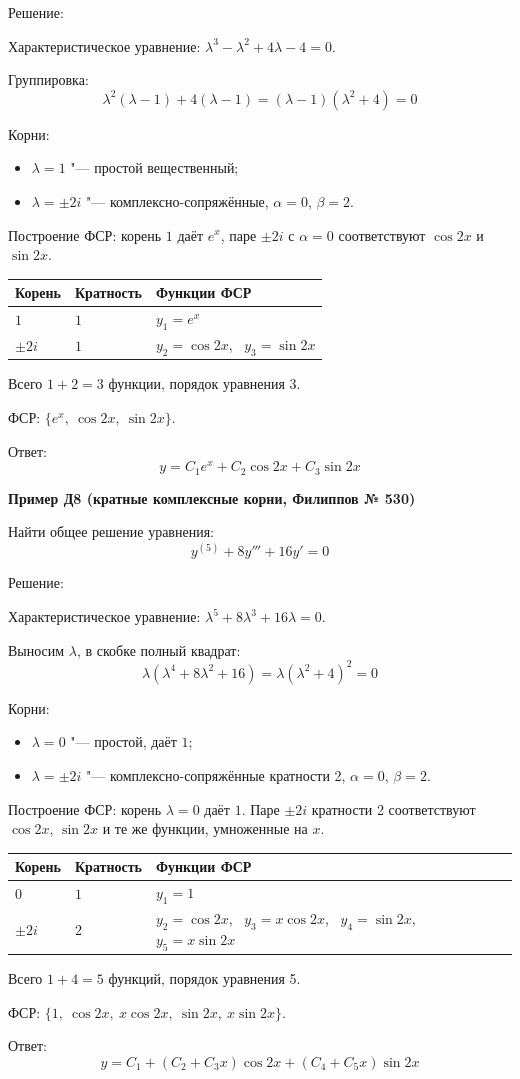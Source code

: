\documentclass[11pt,a4paper]{article}
\makeatletter
\newcommand{\example}[1]{\par\medskip\noindent\textbf{#1}\par\nopagebreak\smallskip}
\newenvironment{fsrtable}{\begin{center}\begin{tabular}{@{}lll@{}}\toprule
Корень & Кратность & Функции ФСР\\\midrule}{\\\bottomrule\end{tabular}\end{center}}
\makeatother
\begin{document}
Решение:

Характеристическое уравнение: $\lambda^3 - \lambda^2 + 4\lambda - 4 = 0$.

Группировка:
\[
  \lambda^2(\lambda - 1) + 4(\lambda - 1) = (\lambda - 1)(\lambda^2 + 4) = 0
\]

Корни:
\begin{itemize}
  \item $\lambda = 1$ "--- простой вещественный;
  \item $\lambda = \pm 2i$ "--- комплексно-сопряжённые, $\alpha = 0$, $\beta = 2$.
\end{itemize}

Построение ФСР: корень $1$ даёт $e^{x}$, паре $\pm 2i$ с $\alpha = 0$ соответствуют $\cos 2x$ и $\sin 2x$.
\begin{fsrtable}
$1$ & $1$ & $y_1 = e^{x}$\\
$\pm 2i$ & $1$ & $y_2 = \cos 2x$, \ $y_3 = \sin 2x$
\end{fsrtable}

Всего $1 + 2 = 3$ функции, порядок уравнения 3.

ФСР: $\{e^{x},\ \cos 2x,\ \sin 2x\}$.

Ответ:
\[
  y = C_1 e^{x} + C_2\cos 2x + C_3\sin 2x
\]

\example{Пример Д8 (кратные комплексные корни, Филиппов № 530)}

Найти общее решение уравнения:
\[
  y^{(5)} + 8y''' + 16y' = 0
\]

Решение:

Характеристическое уравнение: $\lambda^5 + 8\lambda^3 + 16\lambda = 0$.

Выносим $\lambda$, в скобке полный квадрат:
\[
  \lambda(\lambda^4 + 8\lambda^2 + 16) = \lambda(\lambda^2 + 4)^2 = 0
\]

Корни:
\begin{itemize}
  \item $\lambda = 0$ "--- простой, даёт $1$;
  \item $\lambda = \pm 2i$ "--- комплексно-сопряжённые кратности 2, $\alpha = 0$, $\beta = 2$.
\end{itemize}

Построение ФСР: корень $\lambda = 0$ даёт $1$. Паре $\pm 2i$ кратности 2 соответствуют $\cos 2x$, $\sin 2x$ и те же функции, умноженные на $x$.
\begin{fsrtable}
$0$ & $1$ & $y_1 = 1$\\
$\pm 2i$ & $2$ & $y_2 = \cos 2x$, \ $y_3 = x\cos 2x$, \ $y_4 = \sin 2x$, \ $y_5 = x\sin 2x$
\end{fsrtable}

Всего $1 + 4 = 5$ функций, порядок уравнения 5.

ФСР: $\{1,\ \cos 2x,\ x\cos 2x,\ \sin 2x,\ x\sin 2x\}$.

Ответ:
\[
  y = C_1 + (C_2 + C_3 x)\cos 2x + (C_4 + C_5 x)\sin 2x
\]
\end{document}
